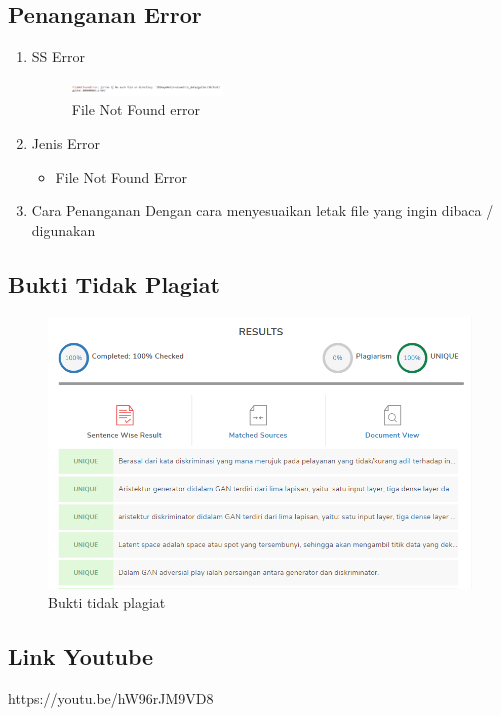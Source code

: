\subsection{Penanganan Error}
\begin{enumerate}
	\item SS Error
	\begin{figure}[H]
		\includegraphics[width=4cm]{figures/1174087/8/error.png}
		\centering
		\caption{File Not Found error}
	\end{figure}
	\item Jenis Error
	\begin{itemize}
		\item File Not Found Error
	\end{itemize}
	\item Cara Penanganan
	\hfill\break
	Dengan cara menyesuaikan letak file yang ingin dibaca / digunakan
\end{enumerate}

\subsection{Bukti Tidak Plagiat}
\begin{figure}[H]
	\centering
	\includegraphics[width=12cm]{figures/1174087/8/plagiat.png}
	\caption{Bukti tidak plagiat}
\end{figure}

\subsection{Link Youtube}
https://youtu.be/hW96rJM9VD8